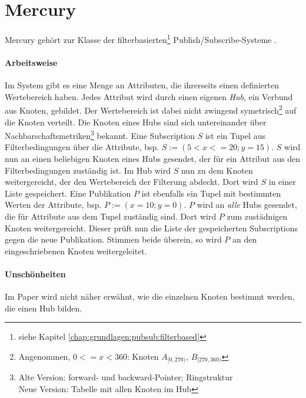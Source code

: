 \section*{Mercury}
\label{chap:related:mercury}
Mercury \cite{Bharambe2004Mercury} gehört zur Klasse der filterbasierten\footnote{siehe Kapitel \ref{chap:grundlagen:pubsub:filterbased}} Publish/Subscribe-Systeme .

\paragraph{Arbeitsweise}
Im System gibt es eine Menge an Attributen, die ihrerseits einen definierten Wertebereich haben. Jedes Attribut wird durch einen eigenen \emph{Hub}, ein Verbund aus Knoten, gebildet. Der Wertebereich ist dabei nicht zwingend symetrisch\footnote{Angenommen, $0<=x<360$: Knoten $A_{[0,270)}$, $B_{[270, 360)}$} auf die Knoten verteilt. Die Knoten eines Hubs sind sich untereinander über Nachbarschaftsmetriken\footnote{Alte Version: forward- und backward-Pointer; Ringstruktur\\Neue Version: Tabelle mit allen Knoten im Hub} bekannt.
Eine Subscription $S$ ist ein Tupel aus Filterbedingungen über die Attribute, bsp. $S := (5 < x <= 20; y = 15)$. $S$ wird nun an einen beliebigen Knoten eines Hubs gesendet, der für ein Attribut aus den Filterbedingungen zuständig ist. Im Hub wird $S$ nun zu dem Knoten weitergereicht, der den Wertebereich der Filterung abdeckt. Dort wird $S$ in einer Liste gespeichert.
Eine Publikation $P$ ist ebenfalls ein Tupel mit bestimmten Werten der Attribute, bsp. $P := (x = 10; y = 0)$. $P$ wird an \emph{alle} Hubs gesendet, die für Attribute aus dem Tupel zuständig sind. Dort wird $P$ zum zustädnigen Knoten weitergereicht. Dieser prüft nun die Liste der gespeicherten Subscriptions gegen die neue Publikation. Stimmen beide überein, so wird $P$ an den eingeschriebenen Knoten weitergeleitet.

\paragraph{Unschönheiten}
Im Paper wird nicht näher erwähnt, wie die einzelnen Knoten bestimmt werden, die einen Hub bilden.

